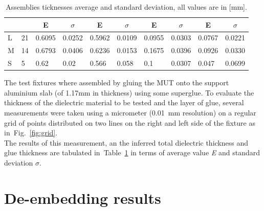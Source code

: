 \documentclass[11pt,a4paper]{article}
\newcommand{\fig}[1]{Fig.~\ref{#1}}
\newcommand{\tabl}[1]{Table~\ref{#1}}
\begin{document}
\begin{table}[!b]
\begin{tabular}{llllllllll}
            \multicolumn{1}{|c|}{}  & \multicolumn{1}{c|}{}   & \multicolumn{1}{c|}{E}      & \multicolumn{1}{c|}{$\sigma$} & \multicolumn{1}{c|}{E}      & \multicolumn{1}{c|}{$\sigma$} & \multicolumn{1}{c|}{E}      & \multicolumn{1}{c|}{$\sigma$} & \multicolumn{1}{c|}{E}      & \multicolumn{1}{c|}{$\sigma$} \\ \hline
            \multicolumn{1}{|l|}{L} & \multicolumn{1}{l|}{21} & \multicolumn{1}{l|}{0.6095} & \multicolumn{1}{l|}{0.0252}   & \multicolumn{1}{l|}{0.5962} & \multicolumn{1}{l|}{0.0109}   & \multicolumn{1}{l|}{0.0955} & \multicolumn{1}{l|}{0.0303}   & \multicolumn{1}{l|}{0.0767} & \multicolumn{1}{l|}{0.0221}   \\ \hline
            \multicolumn{1}{|l|}{M} & \multicolumn{1}{l|}{14} & \multicolumn{1}{l|}{0.6793} & \multicolumn{1}{l|}{0.0406}   & \multicolumn{1}{l|}{0.6236} & \multicolumn{1}{l|}{0.0153}   & \multicolumn{1}{l|}{0.1675} & \multicolumn{1}{l|}{0.0396}   & \multicolumn{1}{l|}{0.0926} & \multicolumn{1}{l|}{0.0330}   \\ \hline
            \multicolumn{1}{|l|}{S} & \multicolumn{1}{l|}{5}  & \multicolumn{1}{l|}{0.62}   & \multicolumn{1}{l|}{0.02}     & \multicolumn{1}{l|}{0.566}  & \multicolumn{1}{l|}{0.058}    & \multicolumn{1}{l|}{0.1}    & \multicolumn{1}{l|}{0.0307}   & \multicolumn{1}{l|}{0.047}  & \multicolumn{1}{l|}{0.0699}   \\ \hline
        \end{tabular}
        \caption{Assemblies ticknesses average and standard deviation, all values are in [mm].}
        \label{tab:thicknesses}
    \end{table}
    The test fixtures where assembled by gluing the MUT onto the support aluminium slab (of 1.17mm in thickness) using
    some superglue.
    To evaluate the thickness of the dielectric material to be tested and the layer of glue, several measurements
    were taken using a micrometer (0.01~mm resolution) on a regular grid of points distributed on two lines on the right and left side
    of the fixture as in~\fig{fig:grid}.\\
    The results of this measurement, an the inferred total dielectric thickness and glue thickness are tabulated
    in~\tabl{tab:thicknesses} in terms of average value \emph{E} and standard deviation $\sigma$.

    \section{De-embedding results}
    \label{sec:de-embedding}
\end{document}
